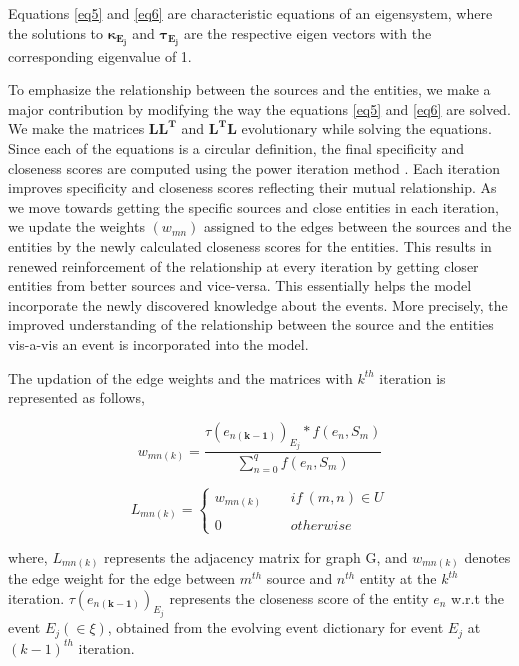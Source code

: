 \noindent Equations \ref{eq5} and \ref{eq6} are characteristic equations of an eigensystem, where the solutions to $\mathbf{\kappa_{E_{j}}}$  and $\mathbf{\tau_{E_{j}}}$ are the respective eigen vectors with the corresponding eigenvalue of 1. 

To emphasize the relationship between the sources and the entities, we make a major contribution by modifying the way the equations \ref{eq5} and \ref{eq6} are solved. We make the matrices $\mathbf{LL^{T}}$ and $\mathbf{L^{T}L}$ evolutionary while solving the equations. Since each of the equations is a circular definition, the final specificity and closeness scores are computed using the power iteration method \cite{golub1996matrix}. Each iteration improves specificity and closeness scores reflecting their mutual relationship. As we move towards getting the specific sources and close entities in each iteration, we update the weights $(w_{mn})$ assigned to the edges between the sources and the entities by the newly calculated closeness scores for the entities. This results in renewed reinforcement of the relationship at every iteration  by getting closer entities from better sources and vice-versa. This essentially helps the model incorporate the newly discovered knowledge about the events. More precisely, the improved understanding of the relationship between the source and the entities vis-a-vis an event is incorporated into the model.



The updation of the edge weights and the matrices with $k^{th}$ iteration is represented as follows,

\begin{equation}
w_{mn(k)} = \frac{\tau(e_{n\mathbf{(k-1)}})_{E_{j}}\ast f(e_{n}, S_{m})}{\displaystyle\sum\limits_{n=0}^q f(e_{n}, S_{m})} 
\end{equation}


\[
L_{mn(k)} = \left\{ \begin{array}{ccc}
w_{mn(k)} & ~~ & if\  (m,n) \in U \\\\
0 & ~~ & otherwise \end{array} \right.
\]

\noindent where, $L_{mn(k)}$ represents the adjacency matrix for graph G, and $w_{mn(k)}$ denotes the edge weight for the edge between $m^{th}$ source and $n^{th}$ entity at the $k^{th}$ iteration. $\tau(e_{n\mathbf{(k-1)}})_{E_{j}}$ represents the closeness score of the entity $e_{n} $ w.r.t the event $E_{j} (\in \xi)$, obtained from the evolving event dictionary for event $E_{j}$ at $(k-1)^{th}$ iteration.

